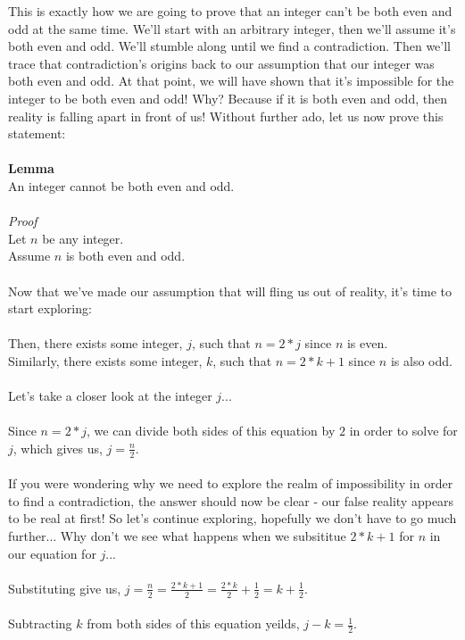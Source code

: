 \documentclass[a4paper,12pt]{article}
\begin{document}
This is exactly how we are going to prove that an integer can't be both even and odd at the same time. We'll start with an arbitrary integer, then we'll assume it's both even and odd. We'll stumble along until we find a contradiction. Then we'll trace that contradiction's origins back to our assumption that our integer was both even and odd. At that point, we will have shown that it's impossible for the integer to be both even and odd! Why? Because if it is both even and odd, then reality is falling apart in front of us! Without further ado, let us now prove this statement:\\
\\
\textbf{Lemma}\\
An integer cannot be both even and odd.\\
\\
\textit{Proof}\\
Let $n$ be any integer.\\
Assume $n$ is both even and odd.\\
\\
Now that we've made our assumption that will fling us out of reality, it's time to start exploring:\\
\\
Then, there exists some integer, $j$, such that $n = 2*j$ since $n$ is even.\\
Similarly, there exists some integer, $k$, such that $n = 2*k + 1$ since $n$ is also odd.\\
\\
Let's take a closer look at the integer $j$...\\
\\
Since $n = 2*j$, we can divide both sides of this equation by $2$ in order to solve for $j$, which gives us, $j = \frac{n}{2}$.\\
\\
If you were wondering why we need to explore the realm of impossibility in order to find a contradiction, the answer should now be clear - our false reality appears to be real at first! So let's continue exploring, hopefully we don't have to go much further... Why don't we see what happens when we subsititue $2*k + 1$ for $n$ in our equation for $j$...\\
\\
Substituting give us, $j = \frac{n}{2} = \frac{2*k + 1}{2} = \frac{2*k}{2} + \frac{1}{2} = k + \frac{1}{2}$.\\
\\ 
Subtracting $k$ from both sides of this equation yeilds, $j - k = \frac{1}{2}$.\\
\end{document}
